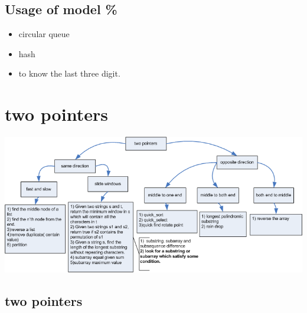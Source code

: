 \documentclass[a4paper,11pt,twoside]{book}
\begin{document}
\subsection{Usage of model \%}

\begin{itemize}
\item circular queue
\item hash
\item to know the last three digit. 
\end{itemize}

\section{two pointers}

\includegraphics[scale=0.6]{pics/two_pointers.png} \newline

\subsection{two pointers}
\end{document}
